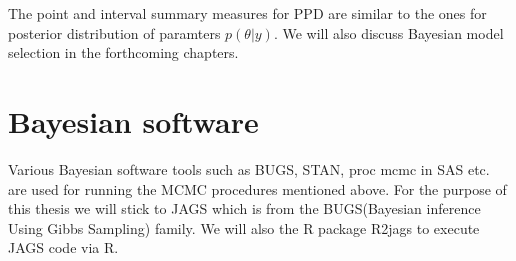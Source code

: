 The point and interval summary measures for PPD are similar to the ones for posterior distribution of paramters $p(\theta|y)$. We will also discuss Bayesian model selection in the forthcoming chapters.

\section{Bayesian software}
Various Bayesian software tools such as BUGS, STAN, proc mcmc in SAS etc. are used for running the MCMC procedures mentioned above. For the purpose of this thesis we will stick to JAGS which is from the BUGS(Bayesian inference Using Gibbs Sampling) family. We will also the R package R2jags to execute JAGS code via R.